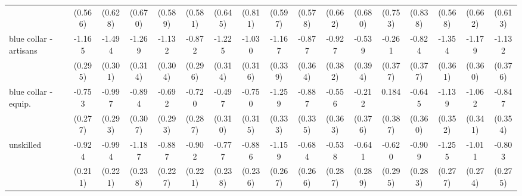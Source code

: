 {\begin{tabular}{l*{16}{c}}
                    &     (0.566)         &     (0.628)         &     (0.670)         &     (0.589)         &     (0.581)         &     (0.645)         &     (0.811)         &     (0.597)         &     (0.578)         &     (0.662)         &     (0.680)         &     (0.753)         &     (0.838)         &     (0.568)         &     (0.662)         &     (0.613)         \\
[1em]
blue collar - artisans&      -1.165\sym{***}&      -1.494\sym{***}&      -1.269\sym{***}&      -1.132\sym{***}&      -0.872\sym{**} &      -1.225\sym{***}&      -1.030\sym{**} &      -1.167\sym{***}&      -0.877\sym{*}  &      -0.927\sym{*}  &      -0.539         &      -0.261         &      -0.824\sym{*}  &      -1.354\sym{***}&      -1.179\sym{**} &      -1.132\sym{**} \\
                    &     (0.295)         &     (0.301)         &     (0.314)         &     (0.304)         &     (0.296)         &     (0.314)         &     (0.316)         &     (0.339)         &     (0.364)         &     (0.382)         &     (0.394)         &     (0.377)         &     (0.377)         &     (0.361)         &     (0.360)         &     (0.376)         \\
[1em]
blue collar - equip.&      -0.753\sym{**} &      -0.997\sym{***}&      -0.894\sym{**} &      -0.692\sym{*}  &      -0.720\sym{*}  &      -0.497         &      -0.750\sym{*}  &      -1.259\sym{***}&      -0.887\sym{**} &      -0.556         &      -0.212         &       0.184         &      -0.645         &      -1.139\sym{**} &      -1.062\sym{**} &      -0.847\sym{*}  \\
                    &     (0.277)         &     (0.293)         &     (0.307)         &     (0.293)         &     (0.287)         &     (0.310)         &     (0.315)         &     (0.333)         &     (0.335)         &     (0.363)         &     (0.376)         &     (0.387)         &     (0.360)         &     (0.352)         &     (0.341)         &     (0.354)         \\
[1em]
unskilled           &      -0.924\sym{***}&      -0.994\sym{***}&      -1.187\sym{***}&      -0.887\sym{***}&      -0.902\sym{***}&      -0.777\sym{**} &      -0.886\sym{***}&      -1.159\sym{***}&      -0.684\sym{*}  &      -0.538         &      -0.641\sym{*}  &      -0.620\sym{*}  &      -0.909\sym{**} &      -1.255\sym{***}&      -1.011\sym{***}&      -0.803\sym{**} \\
                    &     (0.211)         &     (0.221)         &     (0.238)         &     (0.227)         &     (0.221)         &     (0.238)         &     (0.236)         &     (0.267)         &     (0.266)         &     (0.287)         &     (0.289)         &     (0.295)         &     (0.283)         &     (0.277)         &     (0.274)         &     (0.275)         \\

\end{tabular}}
